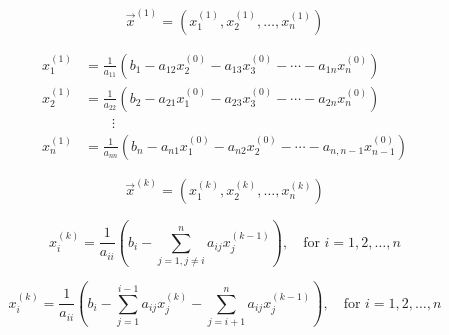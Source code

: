\documentclass[notitlepage]{report}
\begin{document}
$$\vec{x}^{(1)}=\left(x_1^{(1)}, x_2^{(1)}, \dots, x_n^{(1)}\right)$$

\begin{align*}
x_1^{(1)} &= \frac{1}{a_{11}}(b_1 - a_{12}x_2^{(0)} - a_{13}x_3^{(0)} - \cdots - a_{1n}x_n^{(0)})\\
x_2^{(1)} &= \frac{1}{a_{22}}(b_2 - a_{21}x_1^{(0)} - a_{23}x_3^{(0)} - \cdots - a_{2n}x_n^{(0)})\\
    & \qquad \vdots \\                                                                          
x_n^{(1)} &= \frac{1}{a_{nn}}(b_n - a_{n1}x_1^{(0)} - a_{n2}x_2^{(0)} - \cdots - a_{n,n-1}x_{n-1}^{(0)})
\end{align*}

$$\vec{x}^{(k)}=\left(x_1^{(k)}, x_2^{(k)}, \dots, x_n^{(k)}\right)$$

$$
x_i^{(k)} = \frac{1}{a_{ii}} \left(b_i - \sum\limits_{j=1,j\neq i}^n a_{ij}x_j^{(k-1)} \right), \quad \text{for } i=1,2,\dots,n
$$

$$
x_i^{(k)} = \frac{1}{a_{ii}} \left(b_i - \sum\limits_{j=1}^{i-1} a_{ij}x_j^{(k)} -  \sum\limits_{j=i+1}^n a_{ij}x_j^{(k-1)} \right), \quad \text{for } i=1,2,\dots,n
$$
\end{document}
